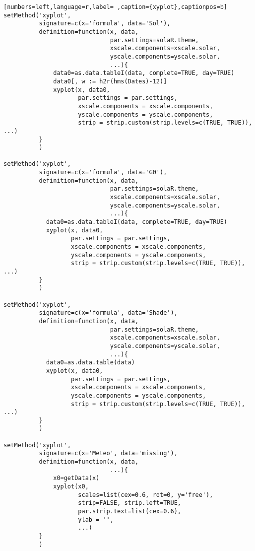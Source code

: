 \begin{lstlisting}[numbers=left,language=r,label= ,caption={xyplot},captionpos=b]
setMethod('xyplot',
          signature=c(x='formula', data='Sol'),
          definition=function(x, data,
                              par.settings=solaR.theme,
                              xscale.components=xscale.solar,
                              yscale.components=yscale.solar,
                              ...){
              data0=as.data.tableI(data, complete=TRUE, day=TRUE)
              data0[, w := h2r(hms(Dates)-12)]
              xyplot(x, data0,
                     par.settings = par.settings,
                     xscale.components = xscale.components,
                     yscale.components = yscale.components,
                     strip = strip.custom(strip.levels=c(TRUE, TRUE)), ...)
          }
          )

setMethod('xyplot',
          signature=c(x='formula', data='G0'),
          definition=function(x, data,
                              par.settings=solaR.theme,
                              xscale.components=xscale.solar,
                              yscale.components=yscale.solar,
                              ...){
            data0=as.data.tableI(data, complete=TRUE, day=TRUE)
            xyplot(x, data0,
                   par.settings = par.settings,
                   xscale.components = xscale.components,
                   yscale.components = yscale.components,
                   strip = strip.custom(strip.levels=c(TRUE, TRUE)), ...)
          }
          )

setMethod('xyplot',
          signature=c(x='formula', data='Shade'),
          definition=function(x, data,
                              par.settings=solaR.theme,
                              xscale.components=xscale.solar,
                              yscale.components=yscale.solar,
                              ...){
            data0=as.data.table(data)
            xyplot(x, data0,
                   par.settings = par.settings,
                   xscale.components = xscale.components,
                   yscale.components = yscale.components,
                   strip = strip.custom(strip.levels=c(TRUE, TRUE)), ...)
          }
          )

setMethod('xyplot',
          signature=c(x='Meteo', data='missing'),
          definition=function(x, data,
                              ...){
              x0=getData(x)
              xyplot(x0,
                     scales=list(cex=0.6, rot=0, y='free'),
                     strip=FALSE, strip.left=TRUE,
                     par.strip.text=list(cex=0.6),
                     ylab = '',
                     ...)
          }
          )


\end{lstlisting}
